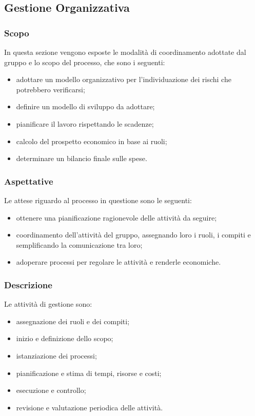 \subsection{Gestione Organizzativa}
\subsubsection{Scopo}
In questa sezione vengono esposte le modalità di coordinamento adottate dal gruppo e lo scopo del processo, che sono i seguenti:
\begin{itemize}
\item adottare un modello organizzativo per l'individuazione dei rischi che potrebbero verificarsi;
\item definire un modello di sviluppo da adottare;
\item pianificare il lavoro rispettando le scadenze;
\item calcolo del prospetto economico in base ai ruoli;
\item determinare un bilancio finale sulle spese.

\end{itemize}
\subsubsection{Aspettative}
Le attese riguardo al processo in questione sono le seguenti: 
\begin{itemize}
\item ottenere una pianificazione ragionevole delle attività da seguire;
\item coordinamento dell'attività del gruppo, assegnando loro i ruoli, i compiti e semplificando la comunicazione tra loro;
\item adoperare processi per regolare le attività e renderle economiche.

\end{itemize}

\subsubsection{Descrizione}
Le attività  di gestione sono: 
\begin{itemize}
\item assegnazione dei ruoli e dei compiti;
\item inizio e definizione dello scopo;
\item istanziazione dei processi;
\item pianificazione e stima di tempi, risorse e costi;
\item esecuzione e controllo;
\item revisione e valutazione periodica delle attività.
\end{itemize}

